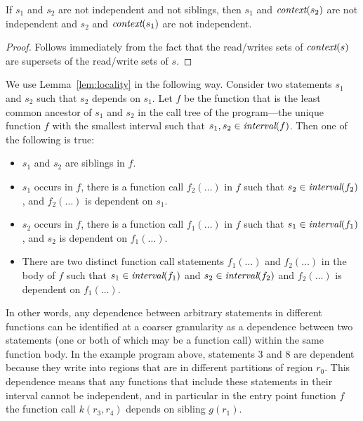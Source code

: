 \begin{lemma}
\rm
\label{lem:locality}
If $s_1$ and $s_2$ are not independent and not siblings, then $s_1$ and $\mbox{\em context}(s_2)$ are not independent
and $s_2$ and $\mbox{\em context}(s_1)$ are not independent.
\end{lemma}
\begin{proof}
Follows immediately from the fact that the read/writes sets of $\mbox{\em context}(s)$ are supersets of the read/write sets of $s$.
\end{proof}
We use Lemma~\ref{lem:locality} in the following way.  Consider two
statements $s_1$ and $s_2$ such that $s_2$ depends on $s_1$.  Let $f$ be the function that is the least
common ancestor of $s_1$ and $s_2$ in the call tree of the
program---the unique function $f$ with the smallest interval such that
$s_1,s_2 \in \mbox{\em interval}(f)$.  Then one of the following is true:
\begin{itemize}
\item $s_1$ and $s_2$ are siblings in $f$.

\item $s_1$ occurs in $f$, there is a function call $f_2(\ldots)$ in $f$ such that $s_2 \in \mbox{\em interval}(f_2)$, and $f_2(\ldots)$
is dependent on $s_1$.

\item $s_2$ occurs in $f$, there is a function call $f_1(\ldots)$ in $f$ such that $s_1 \in \mbox{\em interval}(f_1)$, and
$s_2$ is dependent on $f_1(\ldots)$.

\item There are two distinct function call statements $f_1(\ldots)$ and $f_2(\ldots)$ in the body of $f$ such
that $s_1 \in \mbox{\em interval}(f_1)$ and $s_2 \in \mbox{\em interval}(f_2)$ and $f_2(\ldots)$ is dependent on $f_1(\ldots)$.
\end{itemize}
In other words, any dependence between arbitrary statements
in different functions can be identified at a coarser granularity as a
dependence between two statements (one or both of which may be a function call) within the same function body.  
In the example program above, statements 3 and 8 are
dependent because they write into regions that are in different
partitions of region $r_0$.  This dependence means that any functions
that include these statements in their interval cannot be independent,
and in particular in the entry point function $f$ the function call
$k(r_3,r_4)$ depends on sibling $g(r_1)$.

